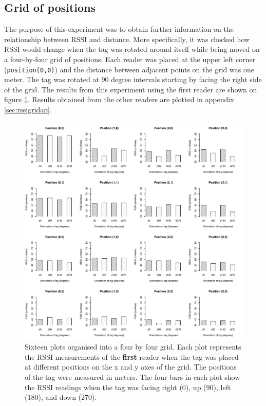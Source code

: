 \subsection{Grid of positions}

The purpose of this experiment was to obtain further information on the relationship between RSSI and distance. More specifically, it was checked how RSSI would change when the tag was rotated around itself while being moved on a four-by-four grid of positions. Each reader was placed at the upper left corner (\verb!position(0,0)!) and the distance between adjacent points on the grid was one meter. The tag was rotated at 90 degree intervals starting by facing the right side of the grid. The results from this experiment using the first reader are shown on figure \ref{fig:rssigrid}. Results obtained from the other readers are plotted in appendix \ref{sec:rssigridap}.
\begin{figure}[H]
	\begin{center}
		\includegraphics[width=1\textwidth]{figures/rssi_distance_grid_r1}
		\caption{Sixteen plots organised into a four by four grid. Each plot represents the RSSI measurements of the \textbf{first} reader when the tag was placed at different positions on the x and y axes of the grid. The positions of the tag were  measured in meters. The four bars in each plot show the RSSI readings when the tag was facing right (0\textdegree), up (90\textdegree), left (180\textdegree), and down (270\textdegree).}
		\label{fig:rssigrid}
	\end{center}
\end{figure}

